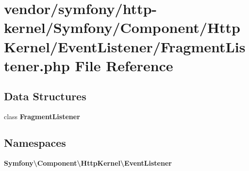 \section{vendor/symfony/http-\/kernel/\+Symfony/\+Component/\+Http\+Kernel/\+Event\+Listener/\+Fragment\+Listener.php File Reference}
\label{_fragment_listener_8php}
\subsection*{Data Structures}
\begin{DoxyCompactItemize}
\item 
class {\bf Fragment\+Listener}
\end{DoxyCompactItemize}
\subsection*{Namespaces}
\begin{DoxyCompactItemize}
\item 
 {\bf Symfony\textbackslash{}\+Component\textbackslash{}\+Http\+Kernel\textbackslash{}\+Event\+Listener}
\end{DoxyCompactItemize}
